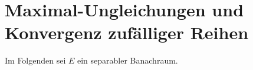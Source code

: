 \chapter{Maximal-Ungleichungen und Konvergenz zufälliger Reihen}
Im Folgenden sei $E$ ein separabler Banachraum. 

\newpage


%
